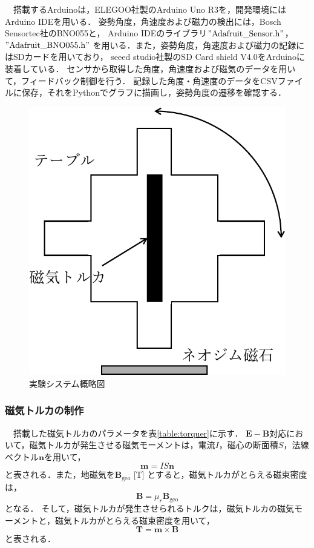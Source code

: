 　搭載するArduinoは，ELEGOO社製のArduino Uno R3を，開発環境にはArduino IDEを用いる．
姿勢角度，角速度および磁力の検出には，Bosch Sensortec社のBNO055と，
Arduino IDEのライブラリ$"\mathrm{Adafruit\_Sensor.h}"$，$"\mathrm{Adafruit\_BNO055.h}"$
を用いる．また，姿勢角度，角速度および磁力の記録にはSDカードを用いており，
seeed studio社製のSD Card shield V4.0をArduinoに装着している．
センサから取得した角度，角速度および磁気のデータを用いて，フィードバック制御を行う．
記録した角度・角速度のデータをCSVファイルに保存，それをPythonでグラフに描画し，姿勢角度の遷移を確認する．

\begin{figure}[H]
	\centering
		\includegraphics[scale=0.5]{./figure/system-crop.pdf}
		\caption{実験システム概略図}
		\label{fig:systemfig}
\end{figure}

\subsubsection{磁気トルカの制作}

　搭載した磁気トルカのパラメータを表\ref{table:torquer}に示す．
$\boldsymbol{E-B}$対応において，磁気トルカが発生させる磁気モーメントは，電流$I$，磁心の断面積$S$，法線ベクトル$\boldsymbol{n}$を用いて，
\begin{equation}
	\boldsymbol{m}=IS\boldsymbol{n}
\end{equation}
と表される．また，地磁気を$\boldsymbol{B}_\mathrm{geo}$ [T] とすると，磁気トルカがとらえる磁束密度は，
\begin{equation}
	\boldsymbol{B} = \mu_r\boldsymbol{B}_\mathrm{geo}
\end{equation}
となる．
そして，磁気トルカが発生させられるトルクは，磁気トルカの磁気モーメントと，磁気トルカがとらえる磁束密度を用いて，
\begin{equation}
	\boldsymbol{T = m \times B}
\end{equation}
と表される．

